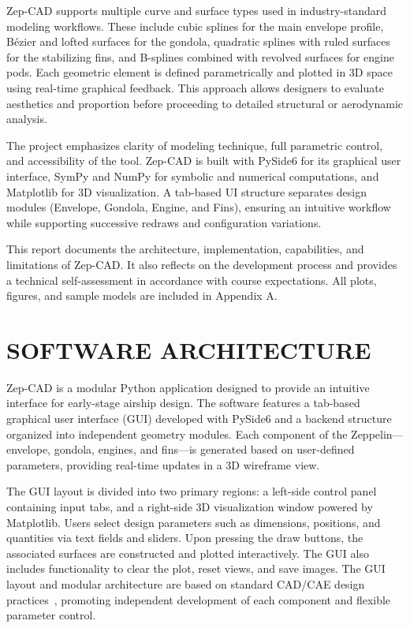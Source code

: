 \documentclass[10pt]{article}
\begin{document}
Zep-CAD supports multiple curve and surface types used in industry-standard modeling workflows. These include 
cubic splines for the main envelope profile, Bézier and lofted surfaces for the gondola, quadratic splines with 
ruled surfaces for the stabilizing fins, and B-splines combined with revolved surfaces for engine pods. Each 
geometric element is defined parametrically and plotted in 3D space using real-time graphical feedback. This 
approach allows designers to evaluate aesthetics and proportion before proceeding to detailed structural or 
aerodynamic analysis.

The project emphasizes clarity of modeling technique, full parametric control, and accessibility of the tool. 
Zep-CAD is built with PySide6 for its graphical user interface, SymPy and NumPy for symbolic and numerical 
computations, and Matplotlib for 3D visualization. A tab-based UI structure separates design modules (Envelope, 
Gondola, Engine, and Fins), ensuring an intuitive workflow while supporting successive redraws and configuration 
variations.

This report documents the architecture, implementation, capabilities, and limitations of Zep-CAD. It also 
reflects on the development process and provides a technical self-assessment in accordance with course 
expectations. All plots, figures, and sample models are included in Appendix A.



\section{SOFTWARE ARCHITECTURE}

Zep-CAD is a modular Python application designed to provide an intuitive interface for early-stage airship design. 
The software features a tab-based graphical user interface (GUI) developed with PySide6 and a backend structure 
organized into independent geometry modules. Each component of the Zeppelin—envelope, gondola, engines, and 
fins—is generated based on user-defined parameters, providing real-time updates in a 3D wireframe view.

The GUI layout is divided into two primary regions: a left-side control panel containing input tabs, and a 
right-side 3D visualization window powered by Matplotlib. Users select design parameters such as dimensions, 
positions, and quantities via text fields and sliders. Upon pressing the draw buttons, the associated surfaces 
are constructed and plotted interactively. The GUI also includes functionality to clear the plot, reset views, 
and save images. The GUI layout and modular architecture are based on standard CAD/CAE design 
practices~\cite{chang2014}, promoting independent development of each component and flexible parameter control.
\end{document}
